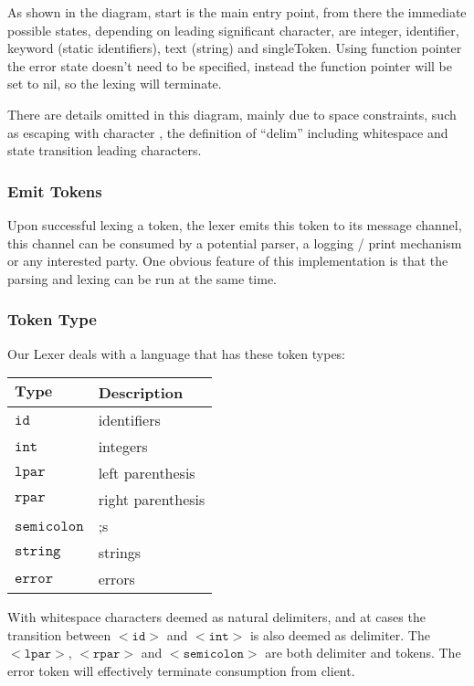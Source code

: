\documentclass[%
 aip,
 jmp,%
 amsmath,amssymb,
 reprint,%
]{revtex4-1}
\begin{document}
As shown in the diagram, {start}
is the main entry point, from there the immediate possible states, depending
on leading significant character, are {integer}, {identifier}, {keyword}
(static identifiers), {text} (string) and {singleToken}. Using function pointer
the {error} state doesn't need to be specified, instead the function pointer
will be set to nil, so the lexing will terminate.

There are details omitted in this diagram, mainly due to space constraints, such
as escaping with character {\large \texttildelow}, the definition of ``delim'' including
whitespace and state transition leading characters.

\subsubsection{Emit Tokens}

Upon successful lexing a token, the lexer emits this token to its message
channel, this channel can be consumed by a potential parser, a logging / print
mechanism or any interested party. One obvious feature of this implementation
is that the parsing and lexing can be run at the same time.

\subsubsection{Token Type}
Our Lexer deals with a language that has these token types:

\begin{table}[h]
\centering
\begin{tabular}{l|l}
$\mathbf{Type}$& Description \\
\hline
$\mathtt{id}$& identifiers \\
$\mathtt{int}$& integers \\
$\mathtt{lpar}$& left parenthesis \\
$\mathtt{rpar}$& right parenthesis \\
$\mathtt{semicolon}$& ;s \\
$\mathtt{string}$& strings \\
$\mathtt{error}$& errors
\end{tabular}
\end{table}

With whitespace characters deemed as natural delimiters, and at cases the
transition between $\mathtt{<id>}$ and $\mathtt{<int>}$ is also deemed as delimiter. The $\mathtt{<lpar>}$,
$\mathtt{<rpar>}$ and $\mathtt{<semicolon>}$ are both delimiter and tokens.
The error token will effectively terminate consumption from client.

\subsubsection{}
\end{document}
